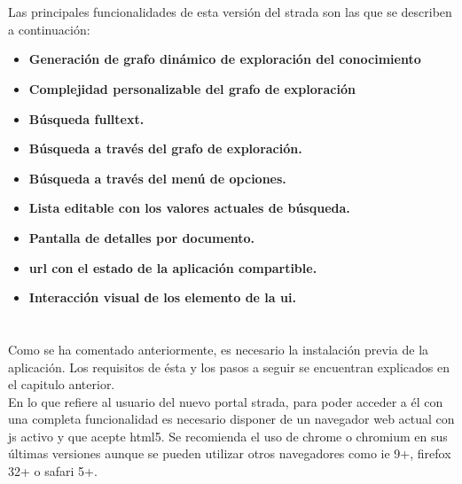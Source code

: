 \section{}
Las principales funcionalidades de esta versión del \gls{strada} son las que se describen a continuación:
\begin{itemize}
	\item \textbf{Generación de grafo dinámico de exploración del conocimiento}
	\item \textbf{Complejidad personalizable del grafo de exploración}
	\item \textbf{Búsqueda \gls{fulltext}.}
	\item \textbf{Búsqueda a través del grafo de exploración.}
	\item \textbf{Búsqueda a través del menú de opciones.}
    \item \textbf{Lista editable con los valores actuales de búsqueda.}
	\item \textbf{Pantalla de detalles por documento.}
    \item \textbf{\gls{url} con el estado de la aplicación compartible.}
    \item \textbf{Interacción visual de los elemento de la \gls{ui}.}
\end{itemize}


\section{}
Como se ha comentado anteriormente, es necesario la instalación previa de la aplicación. Los requisitos de ésta y los pasos a seguir se encuentran explicados en el capitulo anterior.\\

En lo que refiere al usuario del nuevo portal \gls{strada}, para poder acceder a él con una completa funcionalidad es necesario disponer de un navegador web actual con \gls{js} activo y que acepte \gls{html5}. Se recomienda el uso de \gls{chrome} o \gls{chromium} en sus últimas versiones aunque se pueden utilizar otros navegadores como \gls{ie} 9+, \gls{firefox} 32+ o \gls{safari} 5+.


